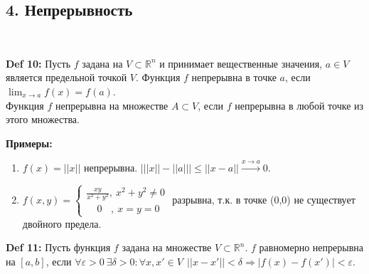 \documentclass[book, 11pt]{report}
\begin{document}
        \subsection*{4. Непрерывность}
        \par{\ }
        \par{\textbf{Def 10: }Пусть $f$ задана на $V\subset\mathbb{R}^n$ и принимает вещественные значения, $a\in V$ является предельной точкой $V$. Функция $f$ непрерывна в точке $a$, если $\displaystyle\lim_{x\to a}f(x)=f(a)$. \\
        Функция $f$ непрерывна на множестве $A\subset V$, если $f$ непрерывна в любой точке из этого множества.
        }
        \vspace{0.4cm}
        \par{\textbf{Примеры:}}
        \begin{enumerate}
            \item \par{$f(x)=||x||$ непрерывна. $\bigg|||x||-||a||\bigg|\leq||x-a||\xrightarrow{x\to a}0$.}
            \item \par{$f(x,y)=\begin{cases}
                \displaystyle\frac{xy}{x^2+y^2}, \ x^2+y^2\ne0 \\
                \ \ \ \ \ 0 \ \ \ \ , \ x=y=0
            \end{cases}$ разрывна, т.к. в точке (0,0) не существует двойного предела.}
        \end{enumerate}
        \newpage
        \par{\textbf{Def 11: }Пусть функция $f$ задана на множестве $V\subset\mathbb{R}^n$. $f$ равномерно непрерывна на $[a,b]$, если $\forall\varepsilon>0 \ \exists\delta>0:\forall x,x'\in V \ \ ||x-x'||<\delta \Rightarrow |f(x)-f(x')|<\varepsilon$.}
        \vspace{0.3cm}
\end{document}

